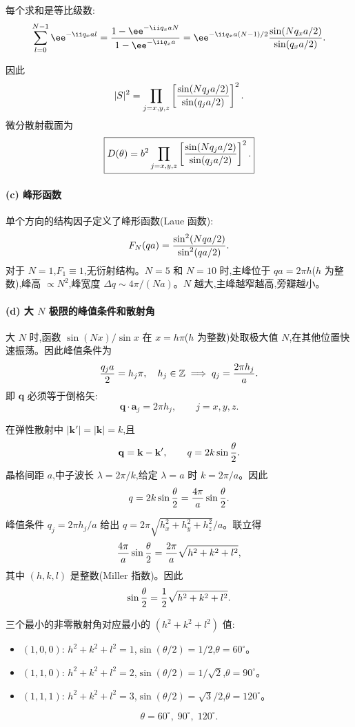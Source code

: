 \begin{question}
\begin{solution}
每个求和是等比级数:
\[
\sum_{l=0}^{N-1}\ee^{-\ii q_x a l}
={1-\ee^{-\ii q_x a N}\over1-\ee^{-\ii q_x a}}
=\ee^{-\ii q_x a(N-1)/2}{\sin(N q_x a/2)\over\sin(q_x a/2)}.
\]

因此
\[
|S|^2=\prod_{j=x,y,z}\left[{\sin(N q_j a/2)\over\sin(q_j a/2)}\right]^2.
\]
微分散射截面为
\[
\boxed{D(\theta)=b^2\prod_{j=x,y,z}\left[{\sin(N q_j a/2)\over\sin(q_j a/2)}\right]^2.}
\]

\paragraph{(c) 峰形函数}

单个方向的结构因子定义了峰形函数(Laue 函数):
\[
F_N(q a)={\sin^2(N q a/2)\over\sin^2(q a/2)}.
\]
对于 $N=1$,$F_1\equiv1$,无衍射结构。$N=5$ 和 $N=10$ 时,主峰位于 $qa=2\pi h$($h$ 为整数),峰高 $\propto N^2$,峰宽度 $\Delta q\sim 4\pi/(Na)$。$N$ 越大,主峰越窄越高,旁瓣越小。

\paragraph{(d) 大 $N$ 极限的峰值条件和散射角}

大 $N$ 时,函数 $\sin(Nx)/\sin x$ 在 $x=h\pi$($h$ 为整数)处取极大值 $N$,在其他位置快速振荡。因此峰值条件为
\[
{q_j a\over2}=h_j\pi,\quad h_j\in\mathbb Z\;\Longrightarrow\;q_j={2\pi h_j\over a}.
\]
即 $\mathbf q$ 必须等于倒格矢:
\[
\boxed{\mathbf q\cdot\mathbf a_j=2\pi h_j,\qquad j=x,y,z.}
\]

在弹性散射中 $|\mathbf k'|=|\mathbf k|=k$,且
\[
\mathbf q=\mathbf k-\mathbf k',\qquad q=2k\sin{\theta\over2}.
\]
晶格间距 $a$,中子波长 $\lambda=2\pi/k$,给定 $\lambda=a$ 时 $k=2\pi/a$。因此
\[
q=2k\sin{\theta\over2}={4\pi\over a}\sin{\theta\over2}.
\]

峰值条件 $q_j=2\pi h_j/a$ 给出 $q=2\pi\sqrt{h_x^2+h_y^2+h_z^2}/a$。联立得
\[
{4\pi\over a}\sin{\theta\over2}={2\pi\over a}\sqrt{h^2+k^2+l^2},
\]
其中 $(h,k,l)$ 是整数(Miller 指数)。因此
\[
\sin{\theta\over2}={1\over2}\sqrt{h^2+k^2+l^2}.
\]

三个最小的非零散射角对应最小的 $(h^2+k^2+l^2)$ 值:
\begin{itemize}
\item $(1,0,0)$: $h^2+k^2+l^2=1$,$\sin(\theta/2)=1/2$,$\theta=60^\circ$。
\item $(1,1,0)$: $h^2+k^2+l^2=2$,$\sin(\theta/2)=1/\sqrt{2}$,$\theta=90^\circ$。
\item $(1,1,1)$: $h^2+k^2+l^2=3$,$\sin(\theta/2)=\sqrt{3}/2$,$\theta=120^\circ$。
\end{itemize}
\[
\boxed{\theta=60^\circ,\;90^\circ,\;120^\circ.}
\]
\end{solution}
\end{question}


